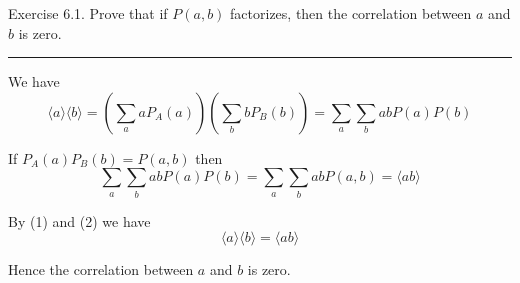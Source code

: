 \documentclass[12pt]{article}
\begin{document}
Exercise 6.1.
Prove that if $P(a,b)$ factorizes, then the correlation
between $a$ and $b$ is zero.

\bigskip
\hrule

\bigskip
We have
\begin{equation*}
\langle a\rangle\langle b\rangle
=\left(\sum_aaP_A(a)\right)\left(\sum_bbP_B(b)\right)
=\sum_a\sum_babP(a)P(b)
\tag{1}
\end{equation*}

If $P_A(a)P_B(b)=P(a,b)$ then
\begin{equation*}
\sum_a\sum_babP(a)P(b)=\sum_a\sum_babP(a,b)=\langle ab\rangle
\tag{2}
\end{equation*}

By (1) and (2) we have
\begin{equation*}
\langle a\rangle\langle b\rangle=\langle ab\rangle
\end{equation*}

Hence the correlation between $a$ and $b$ is zero.
\end{document}
